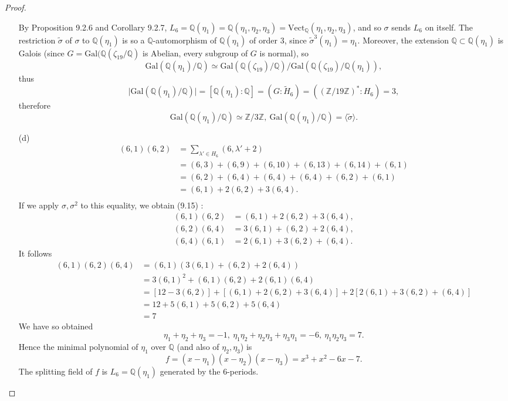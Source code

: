 \documentclass[11pt,a4paper]{article}
\newcommand{\Q}{\mathbb{Q}}
\newcommand{\Z}{\mathbb{Z}}
\newcommand{\Gal}{\mathrm{Gal}}
\begin{document}
\begin{proof}
\begin{enumerate}
By Proposition 9.2.6 and Corollary 9.2.7, $L_6=\Q(\eta_1) =\Q(\eta_1,\eta_2,\eta_3)=\mathrm{Vect}_{\Q}(\eta_1,\eta_2,\eta_3)$, and so $\sigma$ sends $L_6$ on itself. The restriction $\tilde{\sigma}$ of $\sigma$ to $\Q(\eta_1)$ is so a $\Q$-automorphism of $\Q(\eta_1)$ of order 3, since $\tilde{\sigma}^3(\eta_1) = \eta_1$. Moreover, the extension $\Q \subset \Q(\eta_1)$ is Galois (since $G = \Gal(\Q(\zeta_{19}/\Q)$ is Abelian, every subgroup of $G$ is normal), so
$$\Gal(\Q(\eta_1)/\Q) \simeq \Gal(\Q(\zeta_{19})/\Q) / \Gal(\Q(\zeta_{19})/\Q(\eta_1)),$$
thus $$\vert \Gal(\Q(\eta_1)/\Q) \vert = [\Q(\eta_1):\Q] =(G :\tilde{H}_6) = ((\Z/19\Z)^*:H_6) = 3,$$ therefore
$$\Gal(\Q(\eta_1)/\Q) \simeq \Z/3\Z, \ \Gal(\Q(\eta_1)/\Q) = \langle \tilde{\sigma} \rangle.$$


\item[(d)]
\begin{align*}
(6,1)(6,2)&=\sum_{\lambda'\in H_6} (6,\lambda'+2)\\
&=(6,3)+(6,9)+(6,10)+(6,13)+(6,14)+(6,1)\\
&=(6,2)+(6,4)+(6,4)+(6,4)+(6,2)+(6,1)\\
&=(6,1)+2(6,2)+3(6,4).\\
\end{align*}
If we apply  ${\sigma},{\sigma}^2$ to this equality, we obtain (9.15) :
\begin{align*}
(6,1)(6,2) &=(6,1)+2(6,2)+3(6,4),\\
(6,2)(6,4) &= 3(6,1)+(6,2)+2(6,4),\\
(6,4)(6,1) &=2(6,1)+3(6,2)+(6,4).
\end{align*}
It follows
\begin{align*}
(6,1)(6,2)(6,4)&=(6,1)(3(6,1)+(6,2)+2(6,4))\\
&=3(6,1)^2 +(6,1)(6,2)+2(6,1)(6,4)\\
&=[12 - 3(6,2)] + [(6,1)+2(6,2)+3(6,4)] + 2[2(6,1)+3(6,2)+(6,4)]\\
&=12 +5(6,1) +5(6,2)+5(6,4)\\
&=7
\end{align*}
We have so obtained
$$\eta_1+ \eta_2+\eta_3 = -1,\ \eta_1\eta_2+\eta_2\eta_3+\eta_3\eta_1 = -6,\  \eta_1 \eta_2 \eta_3 = 7.$$
Hence the minimal polynomial of $\eta_1$ over $\Q$ (and also of  $\eta_2,\eta_3$) is
$$f=(x-\eta_1)(x-\eta_2)(x-\eta_3) = x^3+x^2-6x-7.$$
The splitting field of $f$ is  $L_6=\Q(\eta_1)$ generated by the 6-periods.



\end{enumerate}
\end{proof}
\end{document}
